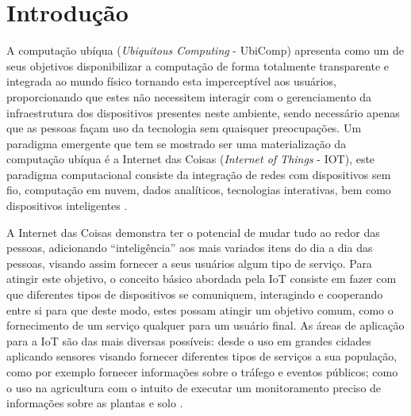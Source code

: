 \documentclass[ti,table]{texufpel} %
\begin{document}
  


\tableofcontents 

  



\chapter{Introdução} 

  

A computação ubíqua (\textit{Ubiquitous Computing} - UbiComp) apresenta como um de seus objetivos  disponibilizar a computação de forma totalmente transparente e integrada ao mundo físico tornando esta imperceptível aos usuários, proporcionando que estes não necessitem interagir com o gerenciamento da infraestrutura dos dispositivos presentes neste ambiente, sendo necessário apenas que as pessoas façam uso da tecnologia sem quaisquer preocupações. Um paradigma emergente que tem se mostrado ser uma materialização da computação ubíqua é a Internet das Coisas (\textit{Internet of Things} - IOT), este paradigma computacional consiste da integração de redes com dispositivos sem fio, computação em nuvem, dados analíticos, tecnologias interativas, bem como dispositivos inteligentes \cite{weiser1999computer}.  

  

A Internet das Coisas demonstra ter o potencial de mudar tudo ao redor das pessoas, adicionando ``inteligência'' aos mais variados itens do dia a dia das pessoas, visando assim fornecer a seus usuários algum tipo de serviço. Para atingir este objetivo, o conceito básico abordada pela IoT consiste em fazer com que diferentes tipos de dispositivos se comuniquem, interagindo e cooperando entre si para que deste modo, estes possam atingir um objetivo comum, como o fornecimento de um serviço qualquer para um usuário final. As áreas de aplicação para a IoT são das mais diversas possíveis: desde o uso em grandes cidades aplicando sensores visando fornecer diferentes tipos de serviços a sua população, como por exemplo fornecer informações sobre o tráfego e eventos públicos; como o uso na agricultura com o intuito de executar um monitoramento preciso de  informações sobre as plantas e solo \cite{gonccalves2017research}. 

  
\end{document}
